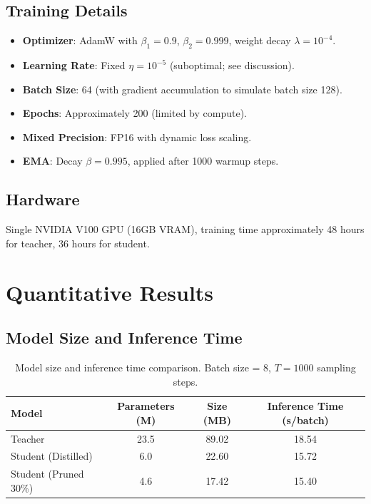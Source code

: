 \documentclass[12pt]{report}
\theoremstyle{definition}
\begin{document}
\subsection{Training Details}

\begin{itemize}
\item \textbf{Optimizer}: AdamW with $\beta_1 = 0.9$, $\beta_2 = 0.999$, weight decay $\lambda = 10^{-4}$.
\item \textbf{Learning Rate}: Fixed $\eta = 10^{-5}$ (suboptimal; see discussion).
\item \textbf{Batch Size}: 64 (with gradient accumulation to simulate batch size 128).
\item \textbf{Epochs}: Approximately 200 (limited by compute).
\item \textbf{Mixed Precision}: FP16 with dynamic loss scaling.
\item \textbf{EMA}: Decay $\beta = 0.995$, applied after 1000 warmup steps.
\end{itemize}

\subsection{Hardware}

Single NVIDIA V100 GPU (16GB VRAM), training time approximately 48 hours for teacher, 36 hours for student.

\section{Quantitative Results}

\subsection{Model Size and Inference Time}

\begin{table}[H]
\centering
\begin{tabular}{lccc}
\toprule
\textbf{Model} & \textbf{Parameters (M)} & \textbf{Size (MB)} & \textbf{Inference Time (s/batch)} \\
\midrule
Teacher & 23.5 & 89.02 & 18.54 \\
Student (Distilled) & 6.0 & 22.60 & 15.72 \\
Student (Pruned 30\%) & 4.6 & 17.42 & 15.40 \\
\bottomrule
\end{tabular}
\caption{Model size and inference time comparison. Batch size = 8, $T = 1000$ sampling steps.}
\label{tab:model_sizes}
\end{table}
\end{document}
